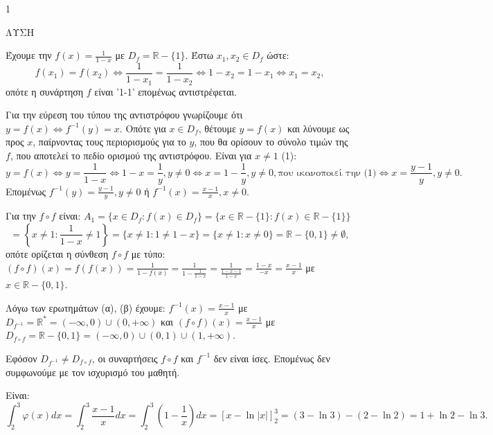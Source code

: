 \begin{ylh}{1}
    \item [Ύλη από εικόνα]
\end{ylh}
ΛΥΣΗ
\begin{alist}
\item [α)] Έχουμε την $f(x) = \frac{1}{1-x}$ με $D_f = \mathbb{R}-\{1\}$. Έστω $x_1, x_2 \in D_f$ ώστε:
\[ f(x_1) = f(x_2) \Leftrightarrow \frac{1}{1-x_1} = \frac{1}{1-x_2} \Leftrightarrow 1-x_2 = 1-x_1 \Leftrightarrow x_1 = x_2, \]
οπότε η συνάρτηση $f$ είναι '1-1' επομένως αντιστρέφεται.

Για την εύρεση του τύπου της αντιστρόφου γνωρίζουμε ότι $y = f(x) \Leftrightarrow f^{-1}(y) = x$.
Οπότε για $x \in D_f$, θέτουμε $y = f(x)$ και λύνουμε ως προς $x$, παίρνοντας τους περιορισμούς για το $y$, που θα ορίσουν το σύνολο τιμών της $f$, που αποτελεί το πεδίο ορισμού της αντιστρόφου. Είναι για $x \ne 1$ (1):
\[ y = f(x) \Leftrightarrow y = \frac{1}{1-x} \Leftrightarrow 1-x = \frac{1}{y}, y \ne 0 \Leftrightarrow x = 1-\frac{1}{y}, y \ne 0,\text{που ικανοποιεί την (1)} \Leftrightarrow x = \frac{y-1}{y}, y \ne 0. \]
Επομένως $f^{-1}(y) = \frac{y-1}{y}, y \ne 0$ ή $f^{-1}(x) = \frac{x-1}{x}, x \ne 0$.

\item [β)] Για την $f \circ f$ είναι: $A_1 = \{x \in D_f : f(x) \in D_f\} = \{x \in \mathbb{R}-\{1\} : f(x) \in \mathbb{R}-\{1\}\}$
\[ = \left\{x \ne 1 : \frac{1}{1-x} \ne 1\right\} = \{x \ne 1 : 1 \ne 1-x\} = \{x \ne 1 : x \ne 0\} = \mathbb{R}-\{0,1\} \ne \emptyset, \]
οπότε ορίζεται η σύνθεση $f \circ f$
με τύπο: $(f \circ f)(x) = f(f(x)) = \frac{1}{1-f(x)} = \frac{1}{1-\frac{1}{1-x}} = \frac{1}{\frac{1-x-1}{1-x}} = \frac{1-x}{-x} = \frac{x-1}{x}$ με $x \in \mathbb{R}-\{0,1\}$.

\item [γ)] Λόγω των ερωτημάτων (α), (β) έχουμε:
$f^{-1}(x) = \frac{x-1}{x}$ με $D_{f^{-1}} = \mathbb{R}^* = (-\infty,0) \cup (0,+\infty)$ και
$(f \circ f)(x) = \frac{x-1}{x}$ με $D_{f \circ f} = \mathbb{R}-\{0,1\} = (-\infty,0) \cup (0,1) \cup (1,+\infty)$.

Εφόσον $D_{f^{-1}} \ne D_{f \circ f}$, οι συναρτήσεις $f \circ f$ και $f^{-1}$ δεν είναι ίσες. Επομένως δεν συμφωνούμε με τον ισχυρισμό του μαθητή.

\item [δ)] Είναι:
\[ \int_2^3 \varphi(x)dx = \int_2^3 \frac{x-1}{x}dx = \int_2^3 \left(1-\frac{1}{x}\right)dx = [x-\ln|x|]_2^3 = (3-\ln 3)-(2-\ln 2) = 1+\ln 2-\ln 3. \]
\end{alist}